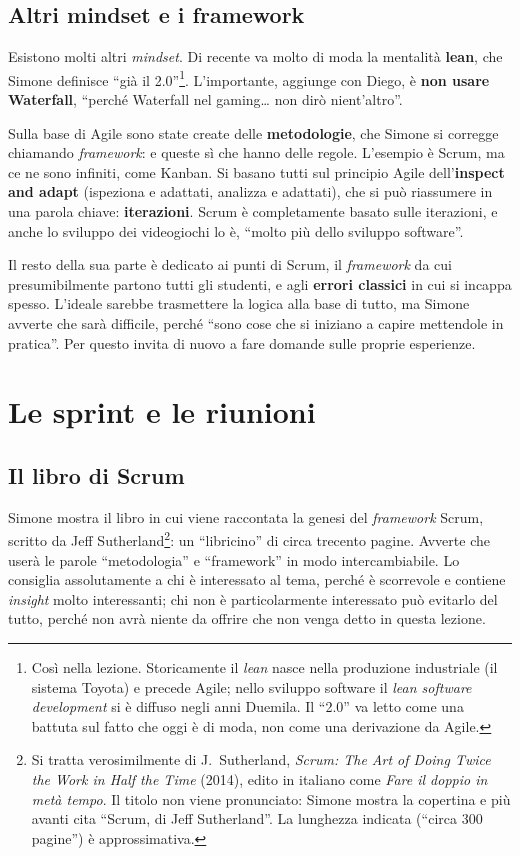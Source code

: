 \subsection{Altri mindset e i framework}

Esistono molti altri \emph{mindset}. Di recente va molto di moda la
mentalità \textbf{lean}, che Simone definisce ``già il 2.0''\footnote{Così
nella lezione. Storicamente il \emph{lean} nasce nella produzione
industriale (il sistema Toyota) e precede Agile; nello sviluppo software il
\emph{lean software development} si è diffuso negli anni Duemila. Il ``2.0''
va letto come una battuta sul fatto che oggi è di moda, non come una
derivazione da Agile.}. L'importante, aggiunge con Diego, è \textbf{non usare
Waterfall}, ``perché Waterfall nel gaming\dots{} non dirò nient'altro''.

Sulla base di Agile sono state create delle \textbf{metodologie}, che
Simone si corregge chiamando \emph{framework}: e queste sì che hanno delle
regole. L'esempio è Scrum, ma ce ne sono infiniti, come Kanban. Si basano
tutti sul principio Agile dell'\textbf{inspect and adapt} (ispeziona e
adattati, analizza e adattati), che si può riassumere in una parola chiave:
\textbf{iterazioni}. Scrum è completamente basato sulle iterazioni, e anche lo
sviluppo dei videogiochi lo è, ``molto più dello sviluppo software''.

Il resto della sua parte è dedicato ai punti di Scrum, il \emph{framework} da
cui presumibilmente partono tutti gli studenti, e agli \textbf{errori
classici} in cui si incappa spesso. L'ideale sarebbe trasmettere la logica
alla base di tutto, ma Simone avverte che sarà difficile, perché ``sono cose
che si iniziano a capire mettendole in pratica''. Per questo invita di nuovo a
fare domande sulle proprie esperienze.

\section{Le sprint e le riunioni}
\label{sec:z3-sprint}

\subsection{Il libro di Scrum}

Simone mostra il libro in cui viene raccontata la genesi del
\emph{framework} Scrum, scritto da Jeff Sutherland\footnote{Si tratta
verosimilmente di J.~Sutherland, \emph{Scrum: The Art of Doing Twice the Work
in Half the Time} (2014), edito in italiano come \emph{Fare il doppio in metà
tempo}. Il titolo non viene pronunciato: Simone mostra la copertina e più
avanti cita ``Scrum, di Jeff Sutherland''. La lunghezza indicata (``circa 300
pagine'') è approssimativa.}: un ``libricino'' di circa trecento pagine.
Avverte che userà le parole ``metodologia'' e ``framework'' in modo
intercambiabile. Lo consiglia assolutamente a chi è interessato al tema,
perché è scorrevole e contiene \emph{insight} molto interessanti; chi non è
particolarmente interessato può evitarlo del tutto, perché non avrà niente da
offrire che non venga detto in questa lezione.

